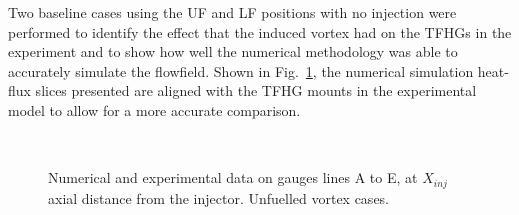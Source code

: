 \documentclass{AIAA}
\begin{document}
Two baseline cases using the UF and LF positions with no injection were performed to identify the effect that the induced vortex had on the TFHGs in the experiment and to show how well the numerical methodology was able to accurately simulate the flowfield.
Shown in Fig.~\ref{fig:HeatFluxVortex_Lines}, the numerical simulation heat-flux slices presented are aligned with the TFHG mounts in the experimental model to allow for a more accurate comparison.



\begin{figure}[!h]
\center
%
\\
\caption{Numerical and experimental data on gauges lines A to E, at $X_{inj}$ axial distance from the injector. Unfuelled vortex cases.}
\label{fig:HeatFluxVortex_Lines}
\end{figure} 
\end{document}
